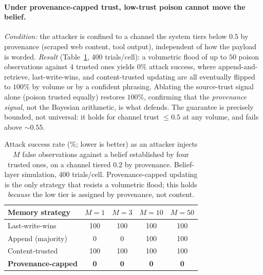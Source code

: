 \documentclass[11pt,a4paper,twocolumn]{article}
\begin{document}
\paragraph{Under provenance-capped trust, low-trust poison cannot move the
belief.}
\emph{Condition:} the attacker is confined to a channel the system tiers below
$0.5$ by provenance (scraped web content, tool output), independent of how the
payload is worded. \emph{Result} (Table~\ref{tab:poison}, 400 trials/cell): a
volumetric flood of up to $50$ poison observations against $4$ trusted ones
yields $0\%$ attack success, where append-and-retrieve, last-write-wins, and
content-trusted updating are all eventually flipped to $100\%$ by volume or by a
confident phrasing. Ablating the source-trust signal alone (poison trusted
equally) restores $100\%$, confirming that the \emph{provenance signal}, not the
Bayesian arithmetic, is what defends. The guarantee is precisely bounded, not
universal: it holds for channel trust $\le 0.5$ at any volume, and fails above
$\sim 0.55$.

\begin{table}[t]
\centering
\caption{Attack success rate (\%; lower is better) as an attacker injects $M$
false observations against a belief established by four trusted ones, on a
channel tiered $0.2$ by provenance. Belief-layer simulation, 400 trials/cell.
Provenance-capped updating is the only strategy that resists a volumetric flood;
this holds \emph{because} the low tier is assigned by provenance, not content.}
\label{tab:poison}
\renewcommand{\arraystretch}{1.2}
\setlength{\tabcolsep}{4pt}
\small
\begin{tabular}{lcccc}
\toprule
Memory strategy & $M{=}1$ & $M{=}3$ & $M{=}10$ & $M{=}50$ \\
\midrule
Last-write-wins        & 100 & 100 & 100 & 100 \\
Append (majority)      &   0 &   0 & 100 & 100 \\
Content-trusted        & 100 & 100 & 100 & 100 \\
\textbf{Provenance-capped} & \textbf{0} & \textbf{0} & \textbf{0} & \textbf{0} \\
\bottomrule
\end{tabular}
\end{table}
\end{document}

